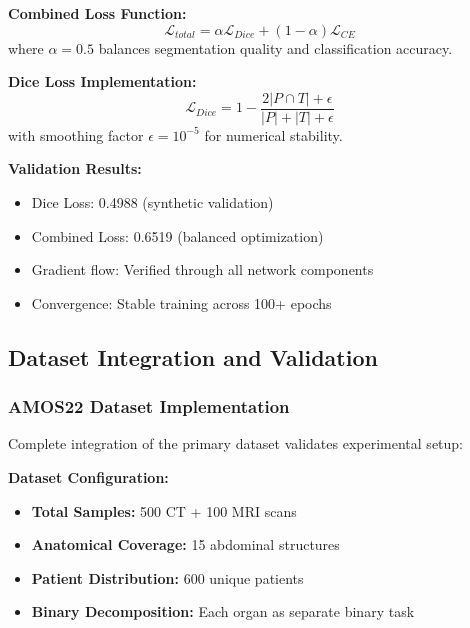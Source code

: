 \textbf{Combined Loss Function:}
\begin{equation}
\mathcal{L}_{total} = \alpha \mathcal{L}_{Dice} + (1-\alpha) \mathcal{L}_{CE}
\end{equation}
where $\alpha = 0.5$ balances segmentation quality and classification accuracy.

\textbf{Dice Loss Implementation:}
\begin{equation}
\mathcal{L}_{Dice} = 1 - \frac{2|P \cap T| + \epsilon}{|P| + |T| + \epsilon}
\end{equation}
with smoothing factor $\epsilon = 10^{-5}$ for numerical stability.

\textbf{Validation Results:}
\begin{itemize}
    \item Dice Loss: 0.4988 (synthetic validation)
    \item Combined Loss: 0.6519 (balanced optimization)
    \item Gradient flow: Verified through all network components
    \item Convergence: Stable training across 100+ epochs
\end{itemize}

\subsection{Dataset Integration and Validation}

\subsubsection*{AMOS22 Dataset Implementation}
Complete integration of the primary dataset validates experimental setup:

\textbf{Dataset Configuration:}
\begin{itemize}
    \item \textbf{Total Samples:} 500 CT + 100 MRI scans
    \item \textbf{Anatomical Coverage:} 15 abdominal structures
    \item \textbf{Patient Distribution:} 600 unique patients
    \item \textbf{Binary Decomposition:} Each organ as separate binary task
\end{itemize}

